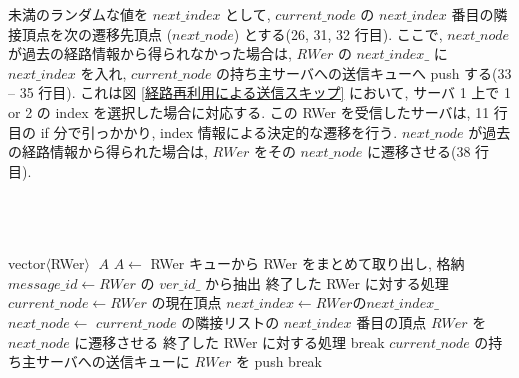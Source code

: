 未満のランダムな値を $next\_index$ として, $current\_node$ の $next\_index$ 番目の隣接頂点を次の遷移先頂点 ($next\_node$) とする(26, 31, 32 行目). ここで, $next\_node$ が過去の経路情報から得られなかった場合は, $RWer$ の $next\_index\_$ に $next\_index$ を入れ, $current\_node$ の持ち主サーバへの送信キューへ push する(33 -- 35 行目). これは図 \ref{経路再利用による送信スキップ} において, サーバ 1 上で 1 or 2 の index を選択した場合に対応する. この RWer を受信したサーバは, 11 行目の if 分で引っかかり, index 情報による決定的な遷移を行う. $next\_node$ が過去の経路情報から得られた場合は, $RWer$ をその $next\_node$ に遷移させる(38 行目). 
\\
\\
\\
\\

\begin{algorithm}[p]
\DontPrintSemicolon
\nl vector$\langle$RWer$\rangle$ $\; A$\;
\nl $A \leftarrow$ RWer キューから RWer をまとめて取り出し, 格納\;
\nl {} {
\nl     $message\_id \leftarrow RWer$ の $ver\_id\_$ から抽出\;
\nl     {} {
\nl         終了した RWer に対する処理\;}
\nl     {} {
\nl         {} {
\nl             $current\_node \leftarrow RWer$ の現在頂点\;
\nl             {} {
\nl                 {} {
\nl                     $next\_index \leftarrow RWer の next\_index\_$\;
\nl                     $next\_node \leftarrow$ $current\_node$ の隣接リストの $next\_index$ 番目の頂点\;
\nl                     $RWer$ を $next\_node$ に遷移させる\;}
\nl                 {} {
\nl                     終了した RWer に対する処理\;
\nl                     break\;}
\nl                 {}}
\nl             {} {
\nl                 {} {
\nl                     $current\_node$ の持ち主サーバへの送信キューに $RWer$ を push\;
\nl                     break\;}
\nl                 {}}}}}
\end{algorithm}
